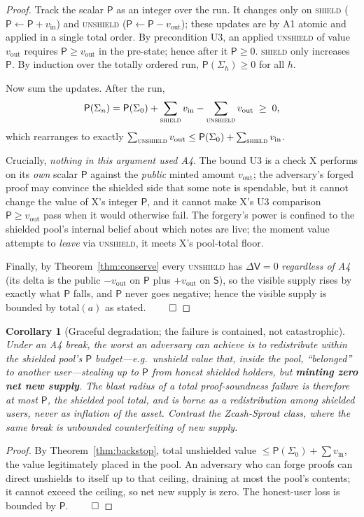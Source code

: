 \documentclass[11pt]{article}
\newtheorem{corollary}[theorem]{Corollary}
\theoremstyle{definition}
\theoremstyle{remark}
\newcommand{\Val}{\mathsf{V}}
\newcommand{\spend}{\mathsf{S}}
\newcommand{\pool}{\mathsf{P}}
\newcommand{\total}{\mathrm{total}}
\begin{document}
\begin{proof}
Track the scalar $\pool$ as an integer over the run. It changes only on
\textsc{shield} ($\pool\gets\pool+v_{\text{in}}$) and \textsc{unshield}
($\pool\gets\pool-v_{\text{out}}$); these updates are by A1 atomic and
applied in a single total order. By precondition U3, an applied
\textsc{unshield} of value $v_{\text{out}}$ requires
$\pool\ge v_{\text{out}}$ in the pre-state; hence after it $\pool\ge 0$.
\textsc{shield} only increases $\pool$. By induction over the totally
ordered run, $\pool(\Sigma_h)\ge 0$ for all $h$.

Now sum the updates. After the run,
\[
  \pool(\Sigma_n) = \pool(\Sigma_0) + \sum_{\textsc{shield}}v_{\text{in}}
    - \sum_{\textsc{unshield}}v_{\text{out}} \;\ge\; 0,
\]
which rearranges to exactly
$\sum_{\textsc{unshield}}v_{\text{out}}\le\pool(\Sigma_0)+
\sum_{\textsc{shield}}v_{\text{in}}$.

Crucially, \emph{nothing in this argument used A4}. The bound U3 is a check
X performs on its \emph{own} scalar $\pool$ against the \emph{public} minted
amount $v_{\text{out}}$; the adversary's forged proof may convince the
shielded side that some note is spendable, but it cannot change the value of
X's integer $\pool$, and it cannot make X's U3 comparison
$\pool\ge v_{\text{out}}$ pass when it would otherwise fail. The forgery's
power is confined to the shielded pool's internal belief about which notes
are live; the moment value attempts to \emph{leave} via \textsc{unshield},
it meets X's pool-total floor.

Finally, by Theorem~\ref{thm:conserve} every \textsc{unshield} has
$\Delta\Val=0$ \emph{regardless of A4} (its delta is the public
$-v_{\text{out}}$ on $\pool$ plus $+v_{\text{out}}$ on $\spend$), so the
visible supply rises by exactly what $\pool$ falls, and $\pool$ never goes
negative; hence the visible supply is bounded by $\total(a)$ as stated.
$\qed$
\end{proof}

\begin{corollary}[Graceful degradation; the failure is contained, not catastrophic]
\label{cor:degrade}
Under an A4 break, the worst an adversary can achieve is to redistribute
\emph{within the shielded pool's $\pool$ budget}---e.g.\ unshield value that,
inside the pool, ``belonged'' to another user---stealing up to $\pool$ from
honest shielded holders, but \textbf{minting zero net new supply}. The blast
radius of a total proof-soundness failure is therefore at most $\pool$, the
shielded pool total, and is borne as a redistribution among shielded users,
never as inflation of the asset. Contrast the Zcash-Sprout class, where the
same break is \emph{unbounded} counterfeiting of new supply.
\end{corollary}
\begin{proof}
By Theorem~\ref{thm:backstop}, total unshielded value $\le\pool(\Sigma_0)+
\sum v_{\text{in}}$, the value legitimately placed in the pool. An adversary
who can forge proofs can direct unshields to itself up to that ceiling,
draining at most the pool's contents; it cannot exceed the ceiling, so net
new supply is zero. The honest-user loss is bounded by $\pool$. $\qed$
\end{proof}
\end{document}
